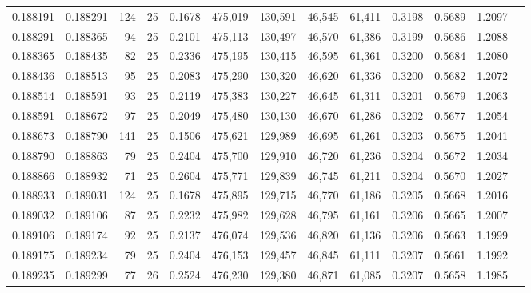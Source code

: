 \begin{tabular}{rrrrrrrrrrrrr}
0.188191 & 0.188291 &   124 &  25 &                                     0.1678 & 475,019 & 130,591 &  46,545 &  61,411 & 0.3198 & 0.5689 & 1.2097 \\
0.188291 & 0.188365 &    94 &  25 &                                     0.2101 & 475,113 & 130,497 &  46,570 &  61,386 & 0.3199 & 0.5686 & 1.2088 \\
0.188365 & 0.188435 &    82 &  25 &                                     0.2336 & 475,195 & 130,415 &  46,595 &  61,361 & 0.3200 & 0.5684 & 1.2080 \\
0.188436 & 0.188513 &    95 &  25 &                                     0.2083 & 475,290 & 130,320 &  46,620 &  61,336 & 0.3200 & 0.5682 & 1.2072 \\
0.188514 & 0.188591 &    93 &  25 &                                     0.2119 & 475,383 & 130,227 &  46,645 &  61,311 & 0.3201 & 0.5679 & 1.2063 \\
0.188591 & 0.188672 &    97 &  25 &                                     0.2049 & 475,480 & 130,130 &  46,670 &  61,286 & 0.3202 & 0.5677 & 1.2054 \\
0.188673 & 0.188790 &   141 &  25 &                                     0.1506 & 475,621 & 129,989 &  46,695 &  61,261 & 0.3203 & 0.5675 & 1.2041 \\
0.188790 & 0.188863 &    79 &  25 &                                     0.2404 & 475,700 & 129,910 &  46,720 &  61,236 & 0.3204 & 0.5672 & 1.2034 \\
0.188866 & 0.188932 &    71 &  25 &                                     0.2604 & 475,771 & 129,839 &  46,745 &  61,211 & 0.3204 & 0.5670 & 1.2027 \\
0.188933 & 0.189031 &   124 &  25 &                                     0.1678 & 475,895 & 129,715 &  46,770 &  61,186 & 0.3205 & 0.5668 & 1.2016 \\
0.189032 & 0.189106 &    87 &  25 &                                     0.2232 & 475,982 & 129,628 &  46,795 &  61,161 & 0.3206 & 0.5665 & 1.2007 \\
0.189106 & 0.189174 &    92 &  25 &                                     0.2137 & 476,074 & 129,536 &  46,820 &  61,136 & 0.3206 & 0.5663 & 1.1999 \\
0.189175 & 0.189234 &    79 &  25 &                                     0.2404 & 476,153 & 129,457 &  46,845 &  61,111 & 0.3207 & 0.5661 & 1.1992 \\
0.189235 & 0.189299 &    77 &  26 &                                     0.2524 & 476,230 & 129,380 &  46,871 &  61,085 & 0.3207 & 0.5658 & 1.1985 \\

\end{tabular}
